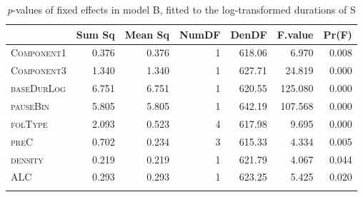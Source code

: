 \begin{table}[H]\fontsize{10}{11}
\caption{\textit{p}-values of fixed effects in model B, fitted to the log-transformed durations of S}
\label{tab:5.8}
\centering
\begin{tabular}{lrrrrrr} 
\lsptoprule
~          & Sum Sq & Mean Sq & NumDF & DenDF  & F.value & Pr(F)  \\ 
\midrule
\textsc{Component1} & 0.376  & 0.376   & 1     & 618.06 & 6.970   & 0.008  \\
\textsc{Component3} & 1.340  & 1.340   & 1     & 627.71 & 24.819  & 0.000  \\
\textsc{baseDurLog} & 6.751  & 6.751   & 1     & 620.55 & 125.080 & 0.000  \\
\textsc{pauseBin}   & 5.805  & 5.805   & 1     & 642.19 & 107.568 & 0.000  \\
\textsc{folType}    & 2.093  & 0.523   & 4     & 617.98 & 9.695   & 0.000  \\
\textsc{preC}       & 0.702  & 0.234   & 3     & 615.33 & 4.334   & 0.005  \\
\textsc{density}    & 0.219  & 0.219   & 1     & 621.79 & 4.067   & 0.044  \\
\textsc{ALC}        & 0.293  & 0.293   & 1     & 623.25 & 5.425   & 0.020  \\
\lspbottomrule
\end{tabular}
\end{table}




